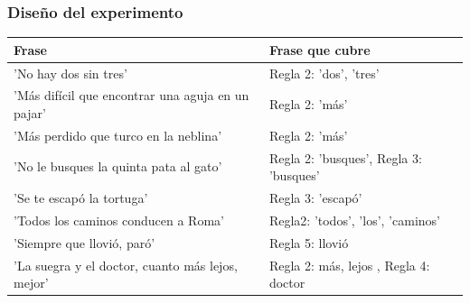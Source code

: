 \documentclass[mathserif]{beamer}%
\begin{document}
\begin{frame}
	\frametitle{Diseño del experimento}
	\scriptsize
	\begin{longtable}{| p{} || p{} |} 
		\hline
		\textbf{Frase} & \textbf{Frase que cubre} \\ \hline	
		
		'No hay dos sin tres' & Regla 2: 'dos', 'tres'\\ \hline
		'Más difícil que encontrar una aguja en un pajar' & Regla 2: 'más' \\ \hline
		'Más perdido que turco en la neblina' & Regla 2: 'más' \\ \hline
		'No le busques la quinta pata al gato' & Regla 2: 'busques', Regla 3: 'busques'   \\ \hline
		'Se te escapó la tortuga' & Regla 3: 'escapó'   \\ \hline
		'Todos los caminos conducen a Roma' & Regla2: 'todos', 'los', 'caminos' \\ \hline
		'Siempre que llovió, paró' & Regla 5: llovió  \\ \hline
		'La suegra y el doctor, cuanto más lejos, mejor' & Regla 2: más, lejos , Regla 4: doctor \\ \hline

\end{longtable}
\end{frame}
\end{document}
